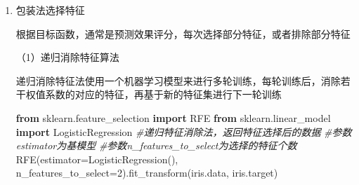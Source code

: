 \documentclass[
]{article}
\newenvironment{Shaded}{}{}
\newcommand{\CommentTok}[1]{\textcolor[rgb]{0.38,0.63,0.69}{\textit{#1}}}
\newcommand{\DecValTok}[1]{\textcolor[rgb]{0.25,0.63,0.44}{#1}}
\newcommand{\ImportTok}[1]{\textcolor[rgb]{0.00,0.50,0.00}{\textbf{#1}}}
\newcommand{\NormalTok}[1]{#1}
\newcommand{\OperatorTok}[1]{\textcolor[rgb]{0.40,0.40,0.40}{#1}}
\begin{document}
\begin{enumerate}
\def\labelenumi{\arabic{enumi}.}
\item
  包装法选择特征

  根据目标函数，通常是预测效果评分，每次选择部分特征，或者排除部分特征

  （1）递归消除特征算法

  递归消除特征法使用一个机器学习模型来进行多轮训练，每轮训练后，消除若干权值系数的对应的特征，再基于新的特征集进行下一轮训练

\begin{Shaded}
\begin{Highlighting}[]
\ImportTok{from}\NormalTok{ sklearn.feature\_selection }\ImportTok{import}\NormalTok{ RFE}
\ImportTok{from}\NormalTok{ sklearn.linear\_model }\ImportTok{import}\NormalTok{ LogisticRegression}
\CommentTok{\#递归特征消除法，返回特征选择后的数据}
\CommentTok{\#参数estimator为基模型}
\CommentTok{\#参数n\_features\_to\_select为选择的特征个数}
\NormalTok{RFE(estimator}\OperatorTok{=}\NormalTok{LogisticRegression(), n\_features\_to\_select}\OperatorTok{=}\DecValTok{2}\NormalTok{).fit\_transform(iris.data, iris.target)}
\end{Highlighting}
\end{Shaded}
\end{enumerate}
\end{document}

